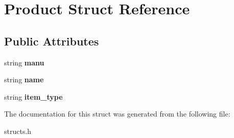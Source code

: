 \hypertarget{struct_product}{}\section{Product Struct Reference}
\label{struct_product}
\subsection*{Public Attributes}
\begin{DoxyCompactItemize}
\item 
\mbox{\label{struct_product_ab35d3c95c72b6a40d1fe9a293d02f829}} 
string {\bfseries manu}
\item 
\mbox{\label{struct_product_acc9bddcf74112d85a6dc231db2269b8d}} 
string {\bfseries name}
\item 
\mbox{\label{struct_product_a6b22f0afb508c3925181994305e6f4ae}} 
string {\bfseries item\+\_\+type}
\end{DoxyCompactItemize}


The documentation for this struct was generated from the following file\+:\begin{DoxyCompactItemize}
\item 
structs.\+h\end{DoxyCompactItemize}
